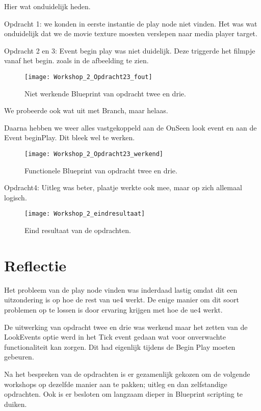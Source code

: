 Hier wat onduidelijk heden.

Opdracht 1: we konden in eerste instantie de play node niet vinden.
Het was wat onduidelijk dat we de movie texture moesten verslepen naar media player target.

Opdracht 2 en 3: Event begin play was niet duidelijk. Deze triggerde het filmpje vanaf het begin.
zoals in de afbeelding te zien.

\begin{figure}[!ht]
  \centering
    \texttt{[image: Workshop\_2\_Opdracht23\_fout]}
    \caption{Niet werkende Blueprint van opdracht twee en drie.}
\end{figure}

We probeerde ook wat uit met Branch, maar helaas.

Daarna hebben we weer alles vastgekoppeld aan de OnSeen look event en aan de Event beginPlay. Dit bleek wel te werken.

\begin{figure}[!ht]
  \centering
    \texttt{[image: Workshop\_2\_Opdracht23\_werkend]}
    \caption{Functionele Blueprint van opdracht twee en drie.}
\end{figure}


Opdracht4: Uitleg was beter, plaatje werkte ook mee, maar op zich allemaal logisch.

\begin{figure}[!ht]
  \centering
    \texttt{[image: Workshop\_2\_eindresultaat]}
    \caption{Eind resultaat van de opdrachten.}
\end{figure}

\section{Reflectie}
Het probleem van de play node vinden was inderdaad lastig omdat dit een uitzondering is op hoe de rest van \gls{ue4} werkt. De enige manier om dit soort problemen op te lossen is door ervaring krijgen met hoe de {ue4} werkt.

De uitwerking van opdracht twee en drie was werkend maar het zetten van de LookEvents optie werd in het Tick event gedaan wat voor onverwachte functionaliteit kan zorgen. Dit had eigenlijk tijdens de Begin Play moeten gebeuren.

Na het bespreken van de opdrachten is er gezamenlijk gekozen om de volgende workshops op dezelfde manier aan te pakken; uitleg en dan zelfstandige opdrachten. Ook is er besloten om langzaam dieper in Blueprint scripting te duiken.

